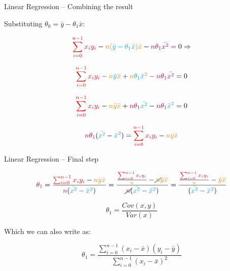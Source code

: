 \documentclass{beamer}
\begin{document}
\begin{frame}
{\centerline{Linear Regression -- Combining the result}}

Substituting $ \theta_0  = \bar{y} - \theta_1 \bar{x} $:

$$ \textcolor{red}{\sum_{i=0}^{n-1}x_iy_i} - \textcolor{orange}{n (\textcolor{cyan}{\bar{y} - \theta_1 \bar{x}}) \bar{x}}  - \textcolor{purple}{n \theta_1 \bar{x^2}} = 0 \Rightarrow $$

$$ \textcolor{red}{\sum_{i=0}^{n-1}x_i y_i} - \textcolor{orange}{n \textcolor{cyan}{\bar{y}}\bar{x}} + \textcolor{orange}{n \textcolor{cyan}{\theta_1 \bar{x}}^2}  - \textcolor{purple}{n \theta_1 \bar{x^2}} = 0$$


$$ \textcolor{red}{\sum_{i=0}^{n-1}x_i y_i} - \textcolor{orange}{n \bar{y}\bar{x}} + \textcolor{purple}{n \theta_1} \textcolor{cyan}{\bar{x^2}}  - \textcolor{purple}{n \theta_1} \textcolor{cyan}{\bar{x}^2}  = 0$$

$$ \textcolor{purple}{n \theta_1} (\textcolor{cyan}{\bar{x^2}}  - \textcolor{cyan}{\bar{x}^2} ) = \textcolor{red}{ \sum_{i=0}^{n-1}x_i y_i} - \textcolor{orange}{n \bar{y}\bar{x}} $$
\end{frame}

\begin{frame}
{\centerline{Linear Regression -- Final step}}

$$ \textcolor{purple}{\theta_1}  = \frac {\textcolor{red}{\sum_{i=0}^{n-1}x_i y_i} - \textcolor{orange}{n \bar{y}\bar{x}}} {\textcolor{purple}{n} (\textcolor{cyan}{\bar{x^2}}  - \textcolor{cyan}{\bar{x}^2} ) }  = \frac { \frac {\textcolor{red}{\sum_{i=0}^{n-1}x_i y_i}}{\textcolor{orange}{n}}  - \cancel{\textcolor{orange}{n}} \textcolor{orange}{\bar{y}\bar{x}}} {  \cancel{\textcolor{purple}{n}} (\textcolor{cyan}{\bar{x^2}}  - \textcolor{cyan}{\bar{x}^2} ) } = \frac { \frac {\textcolor{red}{\sum_{i=0}^{n-1}x_i y_i}}{\textcolor{orange}{n}}  - \textcolor{orange}{\bar{y}\bar{x}}} { (\textcolor{cyan}{\bar{x^2}}  - \textcolor{cyan}{\bar{x}^2} ) } $$
\vspace*{0.2cm}


$$ \theta_1  = \frac { Cov(x,y)} { Var(x) } $$

Which we can also write as:

$$\theta_1 = \frac{\sum_{i=0}^{n-1}(x_i-\bar{x})(y_i-\bar{y})}{\sum_{i=0}^{n-1}(x_i-\bar{x})^2}$$


\end{frame}
\end{document}
